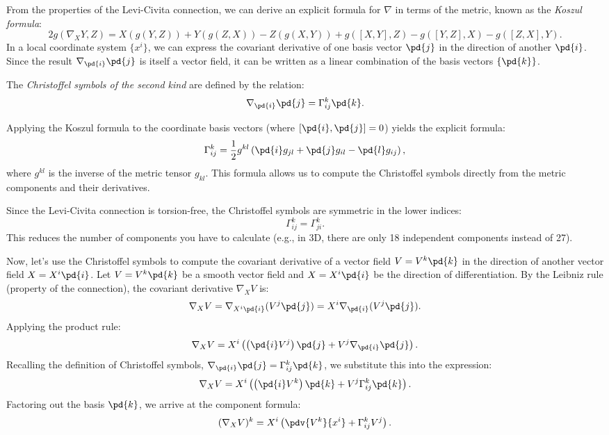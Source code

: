 From the properties of the Levi-Civita connection, we can derive an explicit formula for $\nabla$ in terms of the metric, known as the \emph{Koszul formula}:
\[%
  2 g(\nabla_X Y, Z) = X(g(Y,Z)) + Y(g(Z,X)) - Z(g(X,Y)) + g([X,Y], Z) - g([Y,Z], X) - g([Z,X], Y)
.\]%
In a local coordinate system $\{x^i\}$, we can express the covariant derivative of one basis vector $\pd{j}$ in the direction of another $\pd{i}$. Since the result $\nabla_{\pd{i}} \pd{j}$ is itself a vector field, it can be written as a linear combination of the basis vectors $\{\pd{k}\}$.
\begin{definition}
  The \emph{Christoffel symbols of the second kind} are defined by the relation:
  \[%
    \nabla_{\pd{i}} \pd{j} = \Gamma^k_{ij} \pd{k}
  .\]%

  Applying the Koszul formula to the coordinate basis vectors (where $[\pd{i}, \pd{j}] = 0$) yields the explicit formula:
  \[%
    \Gamma^k_{ij} = \frac{1}{2} g^{kl} \left( \pd{i} g_{jl} + \pd{j} g_{il} - \pd{l} g_{ij} \right)
  ,\]%
  where $g^{kl}$ is the inverse of the metric tensor $g_{kl}$. This formula allows us to compute the Christoffel symbols directly from the metric components and their derivatives.
\end{definition}

Since the Levi-Civita connection is torsion-free, the Christoffel symbols are symmetric in the lower indices:
\[%
  \Gamma^k_{ij} = \Gamma^k_{ji}
.\]%
This reduces the number of components you have to calculate (e.g., in 3D, there are only 18 independent components instead of 27).

Now, let's use the Christoffel symbols to compute the covariant derivative of a vector field $V = V^k \pd{k}$ in the direction of another vector field $X = X^i \pd{i}$.
Let $V = V^k\pd{k}$ be a smooth vector field and $X = X^i\pd{i}$ be the direction of differentiation. By the Leibniz rule (property of the connection), the covariant derivative $\nabla_X V$ is:
\[%
  \nabla_XV = \nabla_{X^i\pd{i}}(V^j\pd{j}) = X^i\nabla_{\pd{i}}(V^j\pd{j})
.\]%
Applying the product rule:
\[%
  \nabla_XV = X^i\left(\left(\pd{i}V^j\right)\pd{j} + V^j\nabla_{\pd{i}}\pd{j}\right)
.\]%
Recalling the definition of Christoffel symbols, $\nabla_{\pd{i}}\pd{j} = \Gamma_{ij}^k \pd{k}$, we substitute this into the expression:
\[%
  \nabla_XV = X^i\left(\left(\pd{i}V^k\right)\pd{k} + V^j\Gamma_{ij}^k \pd{k}\right)
.\]%
Factoring out the basis $\pd{k}$, we arrive at the component formula:
\[%
  (\nabla_X V)^k = X^i \left(\pdv{V^k}{x^i} + \Gamma^k_{ij} V^j\right)
.\]%

